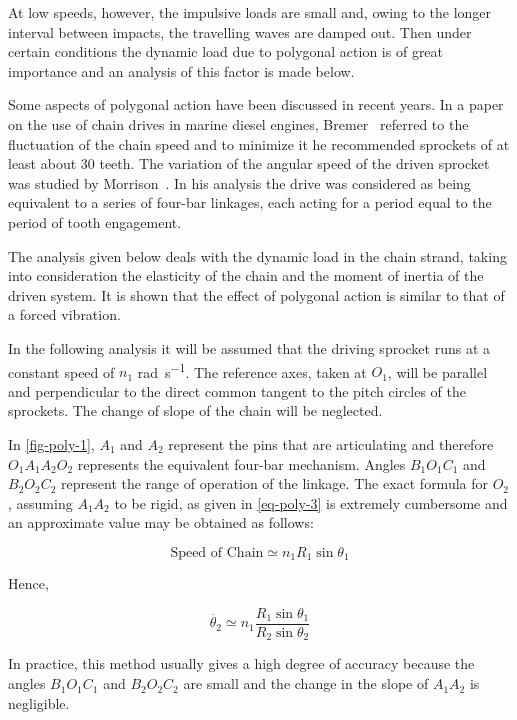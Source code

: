 At low speeds, however, the impulsive loads are small and, owing to the longer interval between impacts, the travelling waves are damped out. Then under certain conditions the dynamic load due to polygonal action is of great importance and an analysis of this factor is made below.

Some aspects of polygonal action have been discussed in recent years. In a paper on the use of chain drives in marine diesel engines, Bremer~\cite{bremer1947} referred to the fluctuation of the chain speed and to minimize it he recommended sprockets of at least about 30 teeth. The variation of the angular speed of the driven sprocket was studied by Morrison~\cite{morrison1952}. In his analysis the drive was considered as being equivalent to a series of four-bar linkages, each acting for a period equal to the period of tooth engagement.

The analysis given below deals with the dynamic load in the chain strand, taking into consideration the elasticity of the chain and the moment of inertia of the driven system. It is shown that the effect of polygonal action is similar to that of a forced vibration.

In the following analysis it will be assumed that the driving sprocket runs at a constant speed of $n_1$ \si{\radian\per\second}. The reference axes, taken at $O_1$, will be parallel and perpendicular to the direct common tangent to the pitch circles of the sprockets. The change of slope of the chain will be neglected.


In \cref{fig-poly-1}, $A_1$ and $A_2$ represent the pins that are articulating and therefore $O_1A_1A_2O_2$ represents the equivalent four-bar mechanism. Angles $B_1O_1C_1$ and $B_2O_2C_2$ represent the range of operation of the linkage. The exact formula for $O_2$, assuming $A_1A_2$ to be rigid, as given in \ref{eq-poly-3} is extremely cumbersome and an approximate value may be obtained as follows:

\begin{equation}
  \text{Speed of Chain} \simeq n_1R_1\sin\theta_1 
\end{equation}

\noindent{} Hence,

\begin{equation}
  \dot{\theta_2} \simeq n_1\frac{R_1\sin\theta_1}{R_2\sin\theta_2}
\end{equation}

In practice, this method usually gives a high degree of accuracy because the angles $B_1O_1C_1$ and $B_2O_2C_2$ are small and the change in the slope of $A_1A_2$ is negligible.

